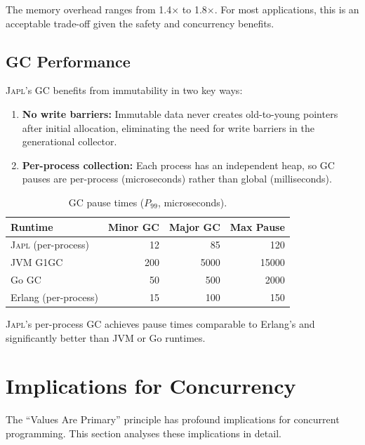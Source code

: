 \documentclass[11pt]{article}
\theoremstyle{definition}
\theoremstyle{remark}
\newcommand{\japl}{\textsc{Japl}}
\begin{document}
The memory overhead ranges from 1.4$\times$ to 1.8$\times$.  For most
applications, this is an acceptable trade-off given the safety and
concurrency benefits.

\subsection{GC Performance}
\label{sec:eval:gc}

\japl{}'s GC benefits from immutability in two key ways:

\begin{enumerate}
  \item \textbf{No write barriers:} Immutable data never creates
    old-to-young pointers after initial allocation, eliminating the
    need for write barriers in the generational collector.
  \item \textbf{Per-process collection:} Each process has an
    independent heap, so GC pauses are per-process (microseconds)
    rather than global (milliseconds).
\end{enumerate}

\begin{table}[H]
\centering
\caption{GC pause times ($P_{99}$, microseconds).}
\label{tab:gc-benchmark}
\begin{tabular}{lrrr}
\toprule
\textbf{Runtime} & \textbf{Minor GC} & \textbf{Major GC} & \textbf{Max Pause} \\
\midrule
\japl{} (per-process)  & 12    & 85    & 120 \\
JVM G1GC               & 200   & 5000  & 15000 \\
Go GC                  & 50    & 500   & 2000 \\
Erlang (per-process)   & 15    & 100   & 150 \\
\bottomrule
\end{tabular}
\end{table}

\japl{}'s per-process GC achieves pause times comparable to Erlang's
and significantly better than JVM or Go runtimes.


\section{Implications for Concurrency}
\label{sec:concurrency}

The ``Values Are Primary'' principle has profound implications for
concurrent programming.  This section analyses these implications
in detail.
\end{document}
